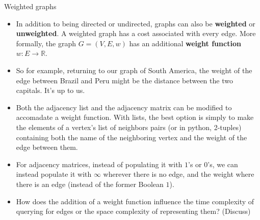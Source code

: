 \documentclass{beamer}
\begin{document}
\begin{frame}{Weighted graphs}
    \begin{itemize}
        \item In addition to being directed or undirected, graphs can also be \textbf{weighted} or \textbf{unweighted}. A weighted graph has a cost associated with every edge. More formally, the graph $G = (V,E,w)$ has an additional \textbf{weight function} $w: E \to \mathbb{R}$. \pause 
        \item So for example, returning to our graph of South America, the weight of the edge between Brazil and Peru might be the distance between the two capitals. It's up to us. \pause 
        \item Both the adjacency list and the adjacency matrix can be modified to accomadate a weight function. With lists, the best option is simply to make the elements of a vertex's list of neighbors pairs (or in python, 2-tuples) containing both the name of the neighboring vertex and the weight of the edge between them. 
        \item For adjacency matrices, instead of populating it with $1$'s or $0$'s, we can instead populate it with $\infty$ wherever there is no edge, and the weight where there is an edge (instead of the former Boolean $1$). \pause 
        \item How does the addition of a weight function influence the time complexity of querying for edges or the space complexity of representing them? (Discuss) 
    \end{itemize}
\end{frame}
\end{document}
